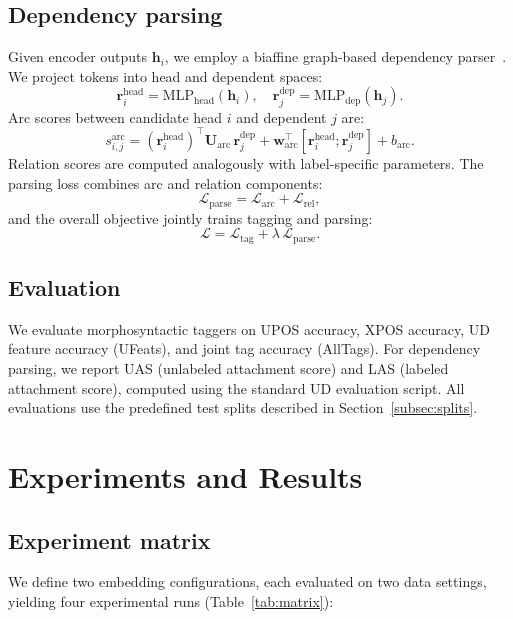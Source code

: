 \documentclass[runningheads]{llncs}
\begin{document}
\subsection{Dependency parsing}
\label{subsec:parsing}
Given encoder outputs $\mathbf{h}_i$, we employ a biaffine graph-based dependency parser~\cite{DBLP:conf/iclr/DozatM17}. We project tokens into head and dependent spaces:
\begin{equation}
\mathbf{r}^{\text{head}}_i=\text{MLP}_{\text{head}}(\mathbf{h}_i),\quad
\mathbf{r}^{\text{dep}}_j=\text{MLP}_{\text{dep}}(\mathbf{h}_j).
\end{equation}
Arc scores between candidate head $i$ and dependent $j$ are:
\begin{equation}
s^{\text{arc}}_{i,j} = (\mathbf{r}^{\text{head}}_i)^\top \mathbf{U}_{\text{arc}}\, \mathbf{r}^{\text{dep}}_j
+ \mathbf{w}_{\text{arc}}^\top [\mathbf{r}^{\text{head}}_i;\mathbf{r}^{\text{dep}}_j] + b_{\text{arc}}.
\end{equation}
Relation scores are computed analogously with label-specific parameters. The parsing loss combines arc and relation components:
\begin{equation}
\mathcal{L}_{\text{parse}} = \mathcal{L}_{\text{arc}} + \mathcal{L}_{\text{rel}},
\end{equation}
and the overall objective jointly trains tagging and parsing:
\begin{equation}
\mathcal{L} = \mathcal{L}_{\text{tag}} + \lambda\,\mathcal{L}_{\text{parse}}.
\end{equation}

\subsection{Evaluation}
\label{subsec:evaluation}
We evaluate morphosyntactic taggers on UPOS accuracy, XPOS accuracy, UD feature accuracy (UFeats), and joint tag accuracy (AllTags). For dependency parsing, we report UAS (unlabeled attachment score) and LAS (labeled attachment score), computed using the standard UD evaluation script. All evaluations use the predefined test splits described in Section~\ref{subsec:splits}.

\section{Experiments and Results}
\label{sec:experiments}

\subsection{Experiment matrix}
\label{subsec:matrix}
We define two embedding configurations, each evaluated on two data settings, yielding four experimental runs (Table~\ref{tab:matrix}):
\end{document}
